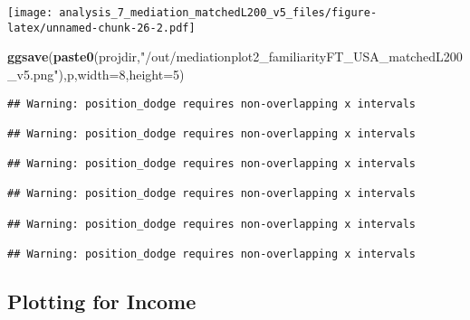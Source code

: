 \documentclass[
]{article}
\newenvironment{Shaded}{\begin{snugshade}}{\end{snugshade}}
\newcommand{\DataTypeTok}[1]{\textcolor[rgb]{0.13,0.29,0.53}{#1}}
\newcommand{\DecValTok}[1]{\textcolor[rgb]{0.00,0.00,0.81}{#1}}
\newcommand{\KeywordTok}[1]{\textcolor[rgb]{0.13,0.29,0.53}{\textbf{#1}}}
\newcommand{\NormalTok}[1]{#1}
\newcommand{\StringTok}[1]{\textcolor[rgb]{0.31,0.60,0.02}{#1}}
\begin{document}
\texttt{[image: analysis\_7\_mediation\_matchedL200\_v5\_files/figure-latex/unnamed-chunk-26-2.pdf]}

\begin{Shaded}
\begin{Highlighting}[]
\KeywordTok{ggsave}\NormalTok{(}\KeywordTok{paste0}\NormalTok{(projdir,}\StringTok{"/out/mediationplot2_familiarityFT_USA_matchedL200_v5.png"}\NormalTok{),p,}\DataTypeTok{width=}\DecValTok{8}\NormalTok{,}\DataTypeTok{height=}\DecValTok{5}\NormalTok{)}
\end{Highlighting}
\end{Shaded}

\begin{verbatim}
## Warning: position_dodge requires non-overlapping x intervals

## Warning: position_dodge requires non-overlapping x intervals

## Warning: position_dodge requires non-overlapping x intervals

## Warning: position_dodge requires non-overlapping x intervals

## Warning: position_dodge requires non-overlapping x intervals

## Warning: position_dodge requires non-overlapping x intervals
\end{verbatim}

\hypertarget{plotting-for-income}{%
\subsection{Plotting for Income}\label{plotting-for-income}}
\end{document}
